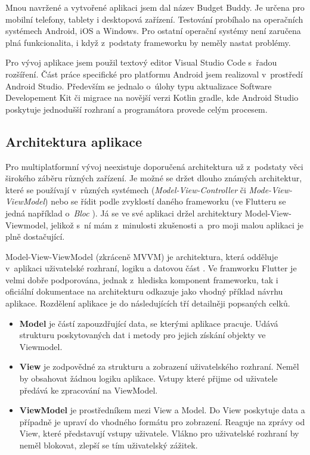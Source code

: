 \documentclass[
  biblatex,
  figures=true,
  tables=false,
  glossaries,
  index
]{kidiplom}
\begin{document}
Mnou navržené a vytvořené aplikaci jsem dal název Budget Buddy. Je určena pro mobilní telefony, tablety i desktopová zařízení. Testování probíhalo na operačních systémech Android, iOS a Windows. Pro ostatní operační systémy není zaručena plná funkcionalita, i když z~podstaty frameworku by neměly nastat problémy.

Pro vývoj aplikace jsem použil textový editor Visual Studio Code s~řadou rozšíření. Část práce specifické pro platformu Android jsem realizoval v~prostředí Android Studio. Především se jednalo o~úlohy typu aktualizace Software Developement Kit či migrace na novější verzi Kotlin gradle, kde Android Studio poskytuje jednodušší rozhraní a programátora provede celým procesem.

\subsection{Architektura aplikace}
Pro multiplatformní vývoj neexistuje doporučená architektura už z~podstaty věci širokého záběru různých zařízení. Je možné se držet dlouho známých architektur, které se používají v~různých systémech (\textit{Model-View-Controller} či \textit{Mode-View-ViewModel}) nebo se řídit podle zvyklostí daného frameworku (ve Flutteru se jedná například o~\textit{Bloc} \cite{bloc}). Já se ve své aplikaci držel architektury Model-View-Viewmodel, jelikož s~ní mám z~minulosti zkušenosti a~pro moji malou aplikaci je plně dostačující. 

Model-View-ViewModel (zkráceně MVVM) je architektura, která odděluje v~aplikaci uživatelské rozhraní, logiku a datovou část \cite{mvvm}. Ve framworku Flutter je velmi dobře podporována, jednak z~hlediska komponent frameworku, tak i oficiální dokumentace na architekturu odkazuje jako vhodný příklad návrhu aplikace. Rozdělení aplikace je do následujících tří detailněji popsaných celků.
\begin{itemize}
  \item \textbf{Model} je částí zapouzdřující data, se kterými aplikace pracuje. Udává strukturu poskytovaných dat i metody pro jejich získání objekty ve Viewmodel.
  \item \textbf{View} je zodpovědné za strukturu a zobrazení uživatelského rozhraní. Neměl by obsahovat žádnou logiku aplikace. Vstupy které přijme od uživatele předává ke zpracování na ViewModel. 
  \item \textbf{ViewModel} je prostředníkem mezi View a Model. Do View poskytuje data a případně je upraví do vhodného formátu pro zobrazení. Reaguje na zprávy od View, které představují vstupy uživatele. Vlákno pro uživatelské rozhraní by neměl blokovat, zlepší se tím uživatelský zážitek.
\end{itemize}
\end{document}
